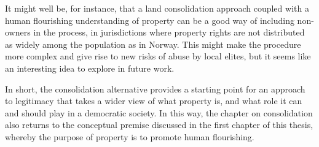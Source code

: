 It might well be, for instance, that a land consolidation approach coupled with a human flourishing understanding of property can be a good way of including non-owners in the process, in jurisdictions where property rights are not distributed as widely among the population as in Norway. This might make the procedure more complex and give rise to new risks of abuse by local elites, but it seems like an interesting idea to explore in future work. 

In short, the consolidation alternative provides a starting point for an approach to legitimacy that takes a wider view of what property is, and what role it can and should play in a democratic society. In this way, the chapter on consolidation also returns to the conceptual premise discussed in the first chapter of this thesis, whereby the purpose of property is to promote human flourishing.

